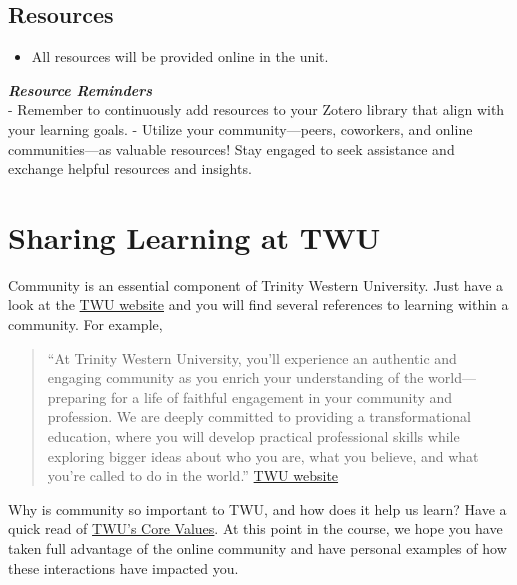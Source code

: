 \documentclass[
]{book}
\providecommand{\tightlist}{%
  \setlength{\itemsep}{0pt}\setlength{\parskip}{0pt}}
\theoremstyle{definition}
\theoremstyle{definition}
\theoremstyle{definition}
\theoremstyle{definition}
\theoremstyle{remark}
\begin{document}
\hypertarget{resources-5}{%
\subsection*{Resources}\label{resources-5}}

\begin{itemize}
\tightlist
\item
  All resources will be provided online in the unit.
\end{itemize}

\begin{feedback}
\textbf{\emph{Resource Reminders}}\\
- Remember to continuously add resources to your Zotero library that
align with your learning goals. - Utilize your community---peers,
coworkers, and online communities---as valuable resources! Stay engaged
to seek assistance and exchange helpful resources and insights.
\end{feedback}

\hypertarget{sharing-learning-at-twu}{%
\section{Sharing Learning at TWU}\label{sharing-learning-at-twu}}

Community is an essential component of Trinity Western University. Just have a look at the \href{https://www.twu.ca/}{TWU website} and you will find several references to learning within a community. For example,

\begin{quote}
``At Trinity Western University, you'll experience an authentic and engaging community as you enrich your understanding of the world---preparing for a life of faithful engagement in your community and profession. We are deeply committed to providing a transformational education, where you will develop practical professional skills while exploring bigger ideas about who you are, what you believe, and what you're called to do in the world.'' \href{https://www.twu.ca/}{TWU website}
\end{quote}

Why is community so important to TWU, and how does it help us learn? Have a quick read of \href{https://www.twu.ca/about-us/commitments/core-values}{TWU's Core Values}. At this point in the course, we hope you have taken full advantage of the online community and have personal examples of how these interactions have impacted you.
\end{document}
